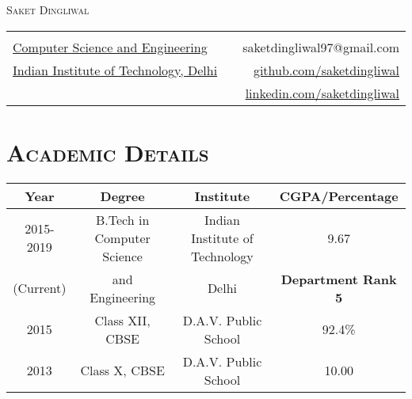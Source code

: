 \documentclass{article}
\newcommand{\tmpsection}[1]{}
\let\tmpsection=\section
\renewcommand{\section}[1]{\tmpsection*{\textsc{#1}}}
\begin{document}

\begin{center}
 {\Large \textsc{Saket Dingliwal} }\\ 
\begin{tabular}{ l p{8cm} r }
    & &   \\
  \href{http://www.cse.iitd.ernet.in/}{Computer Science and Engineering} & & saketdingliwal97@gmail.com \\
  \href{http://www.iitd.ac.in/} {Indian Institute of Technology, Delhi}
  & & \href{https://github.com/saketdingliwal}{github.com/saketdingliwal} \\
  & & \href{https://www.linkedin.com/in/saket-dingliwal-77826b155/}{linkedin.com/saketdingliwal}\\
\end{tabular}
\end{center}


\section{Academic Details}

\begin{center}
\begin{tabular}{ |c | c | c | c |}
\hline
Year & Degree & Institute & CGPA/Percentage \\ 
\hline
2015-2019 & B.Tech in Computer Science & Indian Institute of Technology & 9.67 \\ 
(Current) & and Engineering & Delhi & \textbf{Department Rank 5}\\
\hline


2015 & Class XII, CBSE & D.A.V. Public School & 92.4\% \\ 

\hline
2013 & Class X, CBSE & D.A.V.  Public School & 10.00 \\  \hline
\end{tabular}
\end{center}
\end{document}
